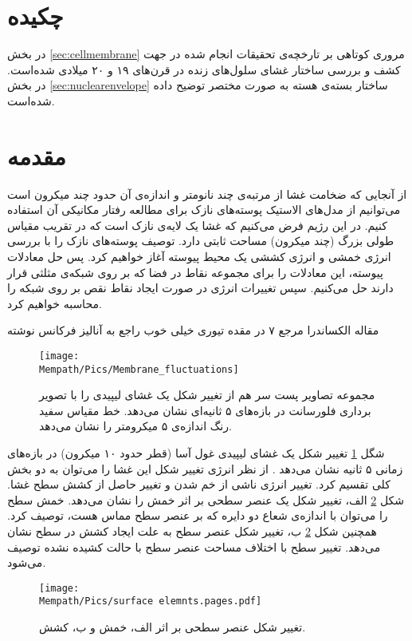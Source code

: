 \setRL
\clearpage
\def \MemModel {\Mempath /MembraneModel}

\section{
چکیده
}
در بخش
\ref{sec:cellmembrane}
مروری کوتاهی بر تارخچه‌ی تحقیقات انجام شده در جهت کشف و بررسی ساختار غشای سلول‌های زنده در قرن‌های ۱۹ و ۲۰ میلادی شده‌است. در بخش
\ref{sec:nuclearenvelope}
ساختار بسته‌ی هسته به صورت مختصر توضیح داده شده‌است.

\section{
مقدمه
}
از آنجایی که ضخامت غشا از مرتبه‌ی چند نانومتر و اندازه‌ی آن حدود چند میکرون است می‌توانیم از مدل‌های الاستیک پوسته‌های نازک برای مطالعه رفتار مکانیکی آن استفاده کنیم. در این رژیم فرض می‌کنیم که غشا یک لایه‌ی نازک است که در تقریب مقیاس طولی بزرگ (چند میکرون) مساحت ثابتی دارد. توصیف پوسته‌های نازک را با بررسی انرژی خمشی و انرژی کششی یک محیط پیوسته آغاز خواهیم کرد. پس حل معادلات پیوسته، این معادلات را برای مجموعه نقاط در فضا که بر روی شبکه‌ی مثلثی قرار دارند حل می‌کنیم. سپس تغییرات انرژی در صورت ایجاد نقاط نقص بر روی شبکه را محاسبه خواهیم کرد. 


مقاله الکساندرا مرجع ۷ در مقده تيوری خیلی خوب راجع به آنالیز فرکانس نوشته


\begin{figure}[h]
\begin{center}
\texttt{[image: \\Mempath/Pics/Membrane\_fluctuations]}
\caption{
مجموعه تصاویر پست سر هم از تغییر شکل یک غشای لیپیدی را با تصویر برداری فلورسانت در بازه‌های ۵ ثانیه‌ای نشان می‌دهد. خط مقیاس سفید رنگ اندازه‌ی ۵ میکرومتر را نشان می‌دهد. 
\cite{ParthasarathyMembraneMeasurement}
}
\label{fig:flucmem}
\end{center}
\end{figure}

شگل 
\ref{fig:flucmem}
تغییر شکل یک غشای لیپیدی غول آسا (قطر حدود ۱۰ میکرون) در بازه‌های زمانی ۵ ثانیه نشان می‌دهد
\cite{ParthasarathyMembraneMeasurement}
. از نظر انرژی تغییر شکل این غشا را می‌توان به دو بخش کلی تقسیم کرد. تغییر انرژی ناشی از خم شدن و تغییر حاصل از کشش سطح غشا. شکل
\ref{fig:elasticdeformation}
الف، تغییر شکل یک عنصر سطحی بر اثر خمش را نشان می‌دهد. خمش سطح را می‌توان با اندازه‌ی شعاع دو دایره که بر عنصر سطح مماس هست، توصیف کرد. همچنین شکل 
\ref{fig:elasticdeformation}
ب، تغییر شکل عنصر سطح به علت ایجاد کشش در سطح نشان می‌دهد. تغییر سطح با اختلاف مساحت عنصر سطح با حالت کشیده نشده توصیف می‌شود.
\begin{figure}[h]
\begin{center}
\texttt{[image: \\Mempath/Pics/surface elemnts.pages.pdf]}
\caption{
تغییر شکل عنصر سطحی بر اثر الف، خمش و ب، کشش.
}
\label{fig:elasticdeformation}
\end{center}
\end{figure}


